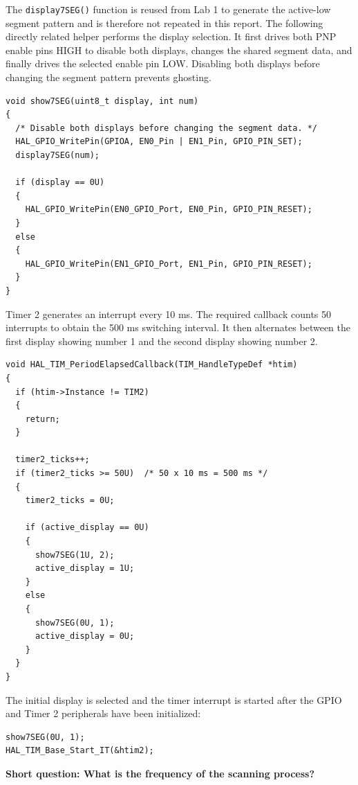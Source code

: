The \texttt{display7SEG()} function is reused from Lab 1 to generate the active-low segment pattern and is therefore not repeated in this report. The following directly related helper performs the display selection. It first drives both PNP enable pins HIGH to disable both displays, changes the shared segment data, and finally drives the selected enable pin LOW. Disabling both displays before changing the segment pattern prevents ghosting.

\begin{lstlisting}[caption={Selecting one display through the active-low PNP enables}]
void show7SEG(uint8_t display, int num)
{
  /* Disable both displays before changing the segment data. */
  HAL_GPIO_WritePin(GPIOA, EN0_Pin | EN1_Pin, GPIO_PIN_SET);
  display7SEG(num);

  if (display == 0U)
  {
    HAL_GPIO_WritePin(EN0_GPIO_Port, EN0_Pin, GPIO_PIN_RESET);
  }
  else
  {
    HAL_GPIO_WritePin(EN1_GPIO_Port, EN1_Pin, GPIO_PIN_RESET);
  }
}
\end{lstlisting}

Timer 2 generates an interrupt every 10 ms. The required callback counts 50 interrupts to obtain the 500 ms switching interval. It then alternates between the first display showing number 1 and the second display showing number 2.

\begin{lstlisting}[caption={Timer callback for scanning the two seven-segment displays}]
void HAL_TIM_PeriodElapsedCallback(TIM_HandleTypeDef *htim)
{
  if (htim->Instance != TIM2)
  {
    return;
  }

  timer2_ticks++;
  if (timer2_ticks >= 50U)  /* 50 x 10 ms = 500 ms */
  {
    timer2_ticks = 0U;

    if (active_display == 0U)
    {
      show7SEG(1U, 2);
      active_display = 1U;
    }
    else
    {
      show7SEG(0U, 1);
      active_display = 0U;
    }
  }
}
\end{lstlisting}

The initial display is selected and the timer interrupt is started after the GPIO and Timer 2 peripherals have been initialized:

\begin{lstlisting}[caption={Starting the first display and Timer 2 interrupt}]
show7SEG(0U, 1);
HAL_TIM_Base_Start_IT(&htim2);
\end{lstlisting}

\textbf{Short question: What is the frequency of the scanning process?}

